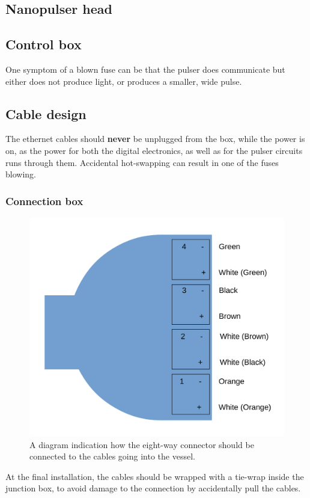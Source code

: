 

\subsection*{Nanopulser head}

\subsection*{Control box}

One symptom of a blown fuse can be that  the pulser does communicate but either does not produce light, or produces a smaller, wide pulse.


\subsection*{Cable design}


The ethernet cables should {\bf never} be unplugged from the box, while the power is on, as the power for both the digital electronics, as well as for the pulser circuits runs through them. Accidental hot-swapping can result in one of the fuses blowing. 

\subsubsection*{Connection box}

\begin{figure}
\begin{center}	
  \includegraphics[width=0.5\linewidth]{figures/connector.pdf}
  \caption{A diagram indication how the eight-way connector should be connected to the cables going into the vessel.}
  \label{figure:connector}
\end{center}
\end{figure}

At the final installation, the cables should be wrapped with a tie-wrap inside the junction box, to avoid damage to the connection by accidentally pull the cables.
